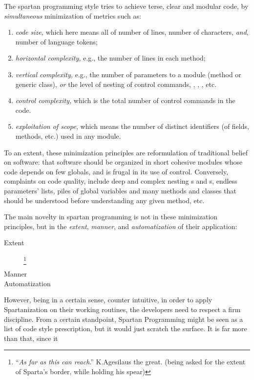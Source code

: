 The spartan programming style tries to achieve terse, clear and modular code,
by \textit{simultaneous} minimization of metrics such as:
\begin{enumerate}
  \item \textit{code size,} which here means all of number of lines, number of
    characters, \emph{and}, number of language tokens;
  \item \textit{horizontal complexity,}  e.g., the number of lines in each
    method;
  \item \textit{vertical complexity,}  e.g., the number of parameters to a
    module (method or generic class), \emph{or} the level of nesting of control
    commands, , , , etc.
  \item \textit{control complexity,} which is the total number of control
    commands in the code.
  \item \textit{exploitation of scope,} which means the number of distinct
    identifiers (of fields, methods, etc.) used in any module. 
\end{enumerate}

To an extent, these minimization principles are reformulation of traditional
belief on software: that software should be organized in short cohesive modules
whose code depends on few globals, and is frugal in its use of control.
Conversely, complaints on code quality, include deep and complex nesting
s and s, endless parameters' lists, piles of global variables
and many methods and classes that should be understood before understanding any
given method, etc.

The main novelty in spartan programming is not in these minimization
principles, but in the \emph{extent}, \emph{manner}, and \emph{automatization}
of their application: 

\begin{description}
  \item[Extent]\footnote{%
     ``\emph{As far as this can reach}.'' K.Agesilaus the great.
    (being asked for the extent of Sparta's border, while holding his spear)
  }
  \item[Manner]
  \item[Automatization]
\end{description}


However, being in a certain sense, counter intuitive, in order to apply
Spartanization on their working routines, the developers need to respect a firm
discipline. From a certain standpoint, Spartan Programming might be seen as a
list of code style prescription, but it would just scratch the surface. It is
far more than that, since it

